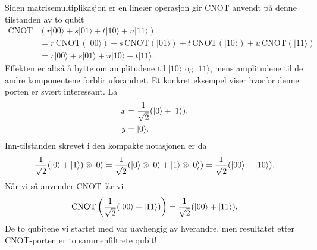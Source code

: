 Siden matrisemultiplikasjon er en lineær operasjon gir CNOT anvendt på denne tilstanden av to qubit
\begin{align*}
	\text{CNOT}&(r|00\rangle + s|01\rangle + t|10\rangle + u|11\rangle) \\
	&= r\,\text{CNOT}(|00\rangle) + s\,\text{CNOT}(|01\rangle) + t\,\text{CNOT}(|10\rangle) + u\,\text{CNOT}(|11\rangle) \\
	&=r|00\rangle + s|01\rangle + u|10\rangle + t|11\rangle.
\end{align*}
Effekten er altså å bytte om amplitudene til $|10\rangle$ og $|11\rangle$, mens amplitudene til de andre komponentene forblir uforandret. Et konkret eksempel viser hvorfor denne porten er svært interessant. La 
\begin{align*}
	x &= \frac{1}{\sqrt{2}}(|0\rangle + |1\rangle), \\
	y &= |0\rangle.
\end{align*}
Inn-tilstanden skrevet i den kompakte notasjonen er da
\begin{displaymath}
	\frac{1}{\sqrt{2}}(|0\rangle + |1\rangle)\otimes|0\rangle = \frac{1}{\sqrt{2}}( |0\rangle\otimes|0\rangle + |1\rangle\otimes|0\rangle) = \frac{1}{\sqrt{2}}(|00\rangle + |10\rangle).
\end{displaymath}
Når vi så anvender CNOT får vi
\begin{displaymath}
	\text{CNOT}\left( \frac{1}{\sqrt{2}}(|00\rangle + |11\rangle) \right) = \frac{1}{\sqrt{2}}(|00\rangle + |11\rangle).
\end{displaymath}
De to qubitene vi startet med var uavhengig av hverandre, men resultatet etter CNOT-porten er to sammenfiltrete qubit!